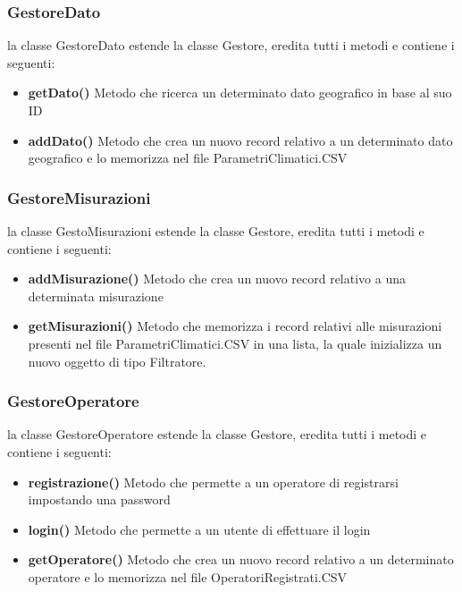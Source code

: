 \documentclass[a4paper, 12pt,twoside]{article}
\begin{document}
			\subsubsection{GestoreDato}
			la classe GestoreDato estende la classe Gestore, eredita tutti i metodi e contiene i seguenti:
			\begin{itemize}
				\item \textbf{getDato()}
				Metodo che ricerca un determinato dato geografico in base al suo ID
				\item \textbf {addDato()}
				Metodo che crea un nuovo record relativo a un determinato dato geografico e lo memorizza nel file ParametriClimatici.CSV
			\end{itemize}
			
			\subsubsection{GestoreMisurazioni}
			la classe GestoMisurazioni estende la classe Gestore, eredita tutti i metodi e contiene i seguenti:
			\begin{itemize}
				\item \textbf{addMisurazione()}
				Metodo che crea un nuovo record relativo a una determinata misurazione
				\item \textbf {getMisurazioni()}
				Metodo che memorizza i record relativi alle misurazioni presenti nel file ParametriClimatici.CSV in una lista, la quale inizializza un nuovo oggetto di tipo Filtratore.
			\end{itemize}
			
			
			\newpage
			\subsubsection{GestoreOperatore}
			la classe GestoreOperatore estende la classe Gestore, eredita tutti i metodi e contiene i seguenti:
			\begin{itemize}
				\item \textbf{registrazione()}
				Metodo che permette a un operatore di registrarsi impostando una password
				\item \textbf{login()}
				Metodo che permette a un utente di effettuare il login
				\item \textbf{getOperatore()}
				Metodo che crea un nuovo record relativo a un determinato operatore e lo memorizza nel file OperatoriRegistrati.CSV
			\end{itemize}
			
			\newpage
			
\end{document}
